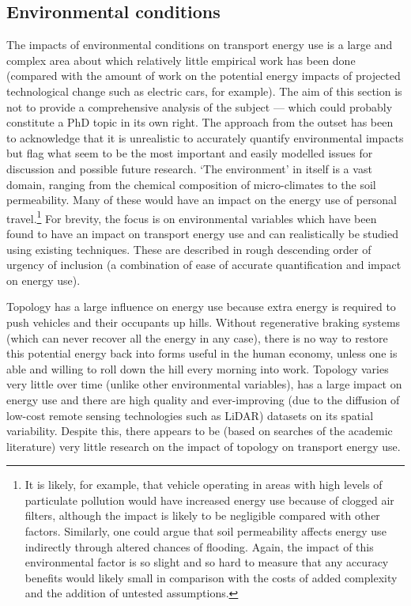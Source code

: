 \subsection{Environmental conditions} 
The impacts of environmental conditions on transport energy use is
a large and complex area about which relatively little empirical work has been
done (compared with the amount of work on the potential energy impacts of
projected technological change such as electric cars, for example).
The aim of this section is not to provide a comprehensive analysis of the
subject --- which could probably constitute a PhD
topic in its own right. The approach from the outset has been to acknowledge that
it is unrealistic to accurately quantify environmental impacts but flag what seem
to be the most important and easily modelled issues for discussion and
possible future research. `The environment' in itself is a vast domain,
ranging from the chemical composition of micro-climates to the soil
permeability. Many of these would have an impact on the energy use of
personal travel.\footnote{It is
likely, for example, that vehicle operating in areas with high levels
of particulate pollution would have increased energy use because
of clogged air filters, although the impact is likely to be negligible
compared with other factors. Similarly, one could argue that soil permeability
affects energy use indirectly through altered chances of flooding.
Again, the impact of this environmental factor is so slight and so hard
to measure that any accuracy benefits would likely small in comparison with
the costs of added complexity and the addition of untested assumptions.
}
For brevity, the focus is on environmental variables
which have been found to have an impact on transport energy use and
can realistically be studied using existing techniques. These are described 
in rough descending order of urgency of inclusion (a combination of ease
of accurate quantification and impact on energy use).


Topology has a large influence on energy use because extra
 energy is required to push vehicles and their occupants up hills. Without
 regenerative braking systems (which can never recover all the energy in
 any case), there is no way to restore this potential energy back into forms
 useful in the human economy, unless
 one is able and willing to roll down the hill every morning into work.
 Topology varies very little over time (unlike other environmental variables),
 has a large impact on energy use and there are high quality and ever-improving
 (due to the diffusion of low-cost remote sensing technologies such as LiDAR)
 datasets on its spatial variability. Despite this, there appears to be
 (based on searches of the academic literature) very little research on the
 impact of topology on transport energy use.

